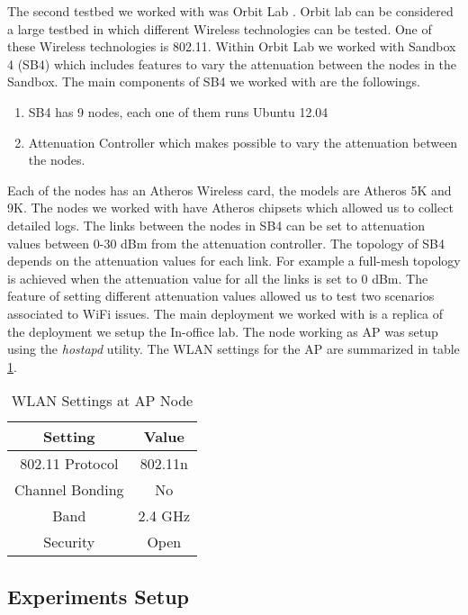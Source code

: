 The second testbed we worked with was Orbit Lab \cite{orbit2005}. Orbit lab can be considered a large testbed in which different Wireless technologies can be tested. One of these Wireless technologies is 802.11. Within Orbit Lab we worked with Sandbox 4 (SB4) which includes features to vary the attenuation between the nodes in the Sandbox. The main components of SB4 we worked with are the followings.

\begin{enumerate}
	\item SB4 has 9 nodes, each one of them runs Ubuntu 12.04
	\item Attenuation Controller which makes possible to vary the attenuation between the nodes.
\end{enumerate}

Each of the nodes has an Atheros Wireless card, the models are Atheros 5K and 9K. The nodes we worked with have Atheros chipsets which allowed us to collect detailed logs. The links between the nodes in SB4 can be set to attenuation values between 0-30 dBm from the attenuation controller. The topology of SB4 depends on the attenuation values for each link. For example a full-mesh topology is achieved when the attenuation value for all the links is set to 0 dBm. The feature of setting different attenuation values allowed us to test two scenarios associated to WiFi issues. The main deployment we worked with is a replica of the deployment we setup the In-office lab. The node working as AP was setup using the \emph{hostapd} utility. The WLAN settings for the AP are summarized in table \ref{table:WLAN_Settings_AP_Node}.

\begin{table}[h]
	\begin{center}
		\begin{tabular}{||c c||}
			\hline
			Setting & Value\\ [0.5ex] 
			\hline\hline
			802.11 Protocol & 802.11n\\ 
			\hline
			Channel Bonding & No\\
			\hline
			Band & 2.4 GHz\\
			\hline
			Security & Open\\ [1ex] 
			\hline
		\end{tabular}
	\end{center}
\caption{WLAN Settings at AP Node}
\label{table:WLAN_Settings_AP_Node}
\end{table} 


\subsection*{Experiments Setup}

